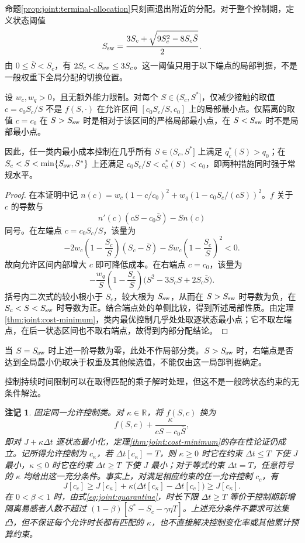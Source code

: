 \documentclass[lang=cn,a4paper,newtx]{elegantpaper}
\numberwithin{equation}{section}
\theoremstyle{plain}
\newtheorem{remarkn}[theorem]{注记}
\begin{document}
命题\ref{prop:joint:terminal-allocation}只刻画退出附近的分配。对于整个控制期，定义状态阈值
\begin{equation}
S_{\rm sw}=\frac{3S_c+\sqrt{9S_c^2-8S_c\bar S}}{2}.
\label{eq:joint:ssw}
\end{equation}
由 $0\le\bar S<S_c$，有 $2S_c<S_{\rm sw}\le3S_c$。这一阈值只用于以下端点的局部判据，不是一般权重下全局分配的切换位置。
\begin{proposition}
\label{prop:joint:global-structure}
设 $w_c,w_q>0$，且无额外能力限制。对每个 $S\in(S_c,S^*]$，仅减少接触的取值 $c=c_0S_c/S$ 不是 $f(S,\cdot)$ 在允许区间 $[c_0S_c/S,c_0]$ 上的局部最小点。仅隔离的取值 $c=c_0$ 在 $S>S_{\rm sw}$ 时是相对于该区间的严格局部最小点，在 $S<S_{\rm sw}$ 时不是局部最小点。

因此，任一类内最小成本控制在几乎所有 $S\in(S_c,S^*]$ 上满足 $q_c^*(S)>q_0$；在 $S_c<S<\min\{S_{\rm sw},S^*\}$ 上还满足 $c_0S_c/S<c_c^*(S)<c_0$，即两种措施同时强于常规水平。
\end{proposition}
\begin{proof}
在本证明中记 $n(c)=w_c(1-c/c_0)^2+w_q(1-c_0S_c/(cS))^2$。$f$ 关于 $c$ 的导数与
\[
n'(c)(cS-c_0\bar S)-S n(c)
\]
同号。在左端点 $c=c_0S_c/S$，该量为
\[
-2w_c\left(1-\frac{S_c}{S}\right)(S_c-\bar S)
-Sw_c\left(1-\frac{S_c}{S}\right)^2<0.
\]
故向允许区间内部增大 $c$ 即可降低成本。在右端点 $c=c_0$，该量为
\[
-\frac{w_q}{S}\left(1-\frac{S_c}{S}\right)
\bigl(S^2-3S_cS+2S_c\bar S\bigr).
\]
括号内二次式的较小根小于 $S_c$，较大根为 $S_{\rm sw}$，从而在 $S>S_{\rm sw}$ 时导数为负，在 $S_c<S<S_{\rm sw}$ 时导数为正。结合端点处的单侧比较，得到所述局部性质。由定理\ref{thm:joint:cost-minimum}，类内最优控制几乎处处取逐状态最小点；它不取左端点，在后一状态区间也不取右端点，故得到内部分配结论。
\end{proof}
当 $S=S_{\rm sw}$ 时上述一阶导数为零，此处不作局部分类。$S>S_{\rm sw}$ 时，右端点是否达到全局最小仍取决于权重及其他候选值，不能仅由这一局部判据确定。

控制持续时间限制可以在取得匹配的乘子解时处理，但这不是一般跨状态约束的无条件解法。
\begin{remarkn}
\label{rem:joint:duration-constraint}
固定同一允许控制类。对 $\kappa\in\mathbb R$，将 $f(S,c)$ 换为
\[
f(S,c)+\frac{\kappa}{cS-c_0\bar S},
\]
即对 $J+\kappa\Delta t$ 逐状态最小化，定理\ref{thm:joint:cost-minimum}的存在性论证仍成立。记所得允许控制为 $c_\kappa$，若 $\Delta t[c_\kappa]=T$，则 $\kappa\ge0$ 时它在约束 $\Delta t\le T$ 下使 $J$ 最小，$\kappa\le0$ 时它在约束 $\Delta t\ge T$ 下使 $J$ 最小；对于等式约束 $\Delta t=T$，任意符号的 $\kappa$ 均给出这一充分条件。事实上，对满足相应约束的任一允许控制 $c_c$，有
\[
J[c_c]\ge J[c_\kappa]+\kappa\bigl(\Delta t[c_\kappa]-\Delta t[c_c]\bigr)\ge J[c_\kappa].
\]
在 $0<\beta<1$ 时，由式\eqref{eq:joint:quarantine}，时长下限 $\Delta t\ge T$ 等价于控制期新增隔离易感者人数不超过 $(1-\beta)[S^*-S_c-\gamma\eta T]$。上述充分条件不要求可达集凸，但不保证每个允许时长都有匹配的 $\kappa$，也不直接解决控制变化率或其他累计预算约束。
\end{remarkn}
\end{document}
